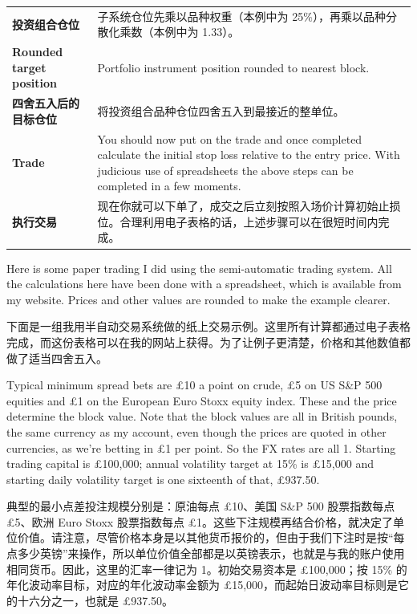 \begin{bilingualtableblock}
{\begin{tabularx}{\textwidth}{@{} p{} Y@{}}
\textbf{投资组合仓位} & 子系统仓位先乘以品种权重（本例中为 25\%），再乘以品种分散化乘数（本例中为 1.33）。 \\
\textbf{Rounded target position} & Portfolio instrument position rounded to nearest block. \\
\textbf{四舍五入后的目标仓位} & 将投资组合品种仓位四舍五入到最接近的整单位。 \\
\textbf{Trade} & You should now put on the trade and once completed calculate the initial stop loss relative to the entry price. With judicious use of spreadsheets the above steps can be completed in a few moments. \\
\textbf{执行交易} & 现在你就可以下单了，成交之后立刻按照入场价计算初始止损位。合理利用电子表格的话，上述步骤可以在很短时间内完成。 \\
\end{tabularx}
}
\end{bilingualtableblock}


\begin{englishblock} Here is some paper trading I did using the semi-automatic trading system. All the calculations here have been done with a spreadsheet, which is available from my website. Prices and other values are rounded to make the example clearer. \end{englishblock}

\begin{chineseblock}下面是一组我用半自动交易系统做的纸上交易示例。这里所有计算都通过电子表格完成，而这份表格可以在我的网站上获得。为了让例子更清楚，价格和其他数值都做了适当四舍五入。\end{chineseblock}


\begin{englishblock} Typical minimum spread bets are £10 a point on crude, £5 on US S\&P 500 equities and £1 on the European Euro Stoxx equity index. These and the price determine the block value. Note that the block values are all in British pounds, the same currency as my account, even though the prices are quoted in other currencies, as we're betting in £1 per point. So the FX rates are all 1. Starting trading capital is £100,000; annual volatility target at 15\% is £15,000 and starting daily volatility target is one sixteenth of that, £937.50. \end{englishblock}

\begin{chineseblock}典型的最小点差投注规模分别是：原油每点 £10、美国 S\&P 500 股票指数每点 £5、欧洲 Euro Stoxx 股票指数每点 £1。这些下注规模再结合价格，就决定了单位价值。请注意，尽管价格本身是以其他货币报价的，但由于我们下注时是按“每点多少英镑”来操作，所以单位价值全部都是以英镑表示，也就是与我的账户使用相同货币。因此，这里的汇率一律记为 1。初始交易资本是 £100,000；按 15\% 的年化波动率目标，对应的年化波动率金额为 £15,000，而起始日波动率目标则是它的十六分之一，也就是 £937.50。 \end{chineseblock}

